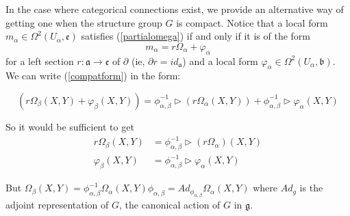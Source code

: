 In the case where categorical connections exist, we provide an alternative way of getting one when the structure group $G$ is compact.
Notice that a local form $m_\alpha\in \Omega^2(U_\alpha,\mathfrak{e})$ satisfies (\ref{partialomega}) if and only if it is of the form
\[ m_\alpha=r\Omega_\alpha+\varphi_\alpha \]
for a left section $r:\mathfrak{a}\rightarrow \mathfrak{e}$ of $\partial$ (ie, $\partial r=id_\mathfrak{a}$) and a local form $\varphi_\alpha\in\Omega^2(U_\alpha,\mathfrak{b})$.
% 
We can write (\ref{compatform}) in the form:

\[
 (r\Omega_\beta (X,Y)+\varphi_\beta(X,Y))=\phi_{\alpha,\beta}^{-1}\vartriangleright(r\Omega_\alpha (X,Y))+\phi_{\alpha,\beta}^{-1}\vartriangleright \varphi_\alpha(X,Y)
\]

So it would be sufficient to get
\begin{align}
          r\Omega_\beta(X,Y)&=\phi_{\alpha,\beta}^{-1}\vartriangleright (r\Omega_\alpha)(X,Y) \label{eq} \\
        \varphi_\beta (X,Y)&=\phi_{\alpha,\beta}^{-1}\vartriangleright \varphi_\alpha (X,Y) 
\end{align}

But $\Omega_\beta(X,Y)=\phi_{\alpha,\beta}^{-1}\Omega_\alpha (X,Y)\phi_{\alpha,\beta}=Ad_{\phi_{\alpha,\beta}} \Omega_\alpha(X,Y)$
where $Ad_g$ is the adjoint representation of $G$, the canonical action of $G$ in $\mathfrak{g}$.

